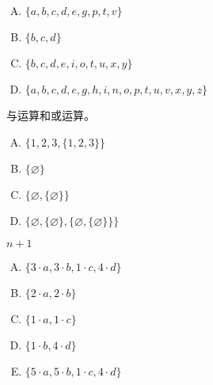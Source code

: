 {{        %
        \begin{practices}
            \begin{enumerate}[A.]
                \item $\{a, b, c, d, e, g, p, t, v\}$
                \item $\{b, c, d\}$
                \item $\{b, c, d, e, i, o, t, u, x, y\}$
                \item $\{a, b, c, d, e, g, h, i, n, o, p, t, u, v, x, y, z\}$
            \end{enumerate}
        \end{practices}

        \begin{practices}
            与运算和或运算。
        \end{practices}

        \begin{practices}
            \begin{enumerate}[A.]
                \item $\{1, 2, 3, \{1, 2, 3\}\}$
                \item $\{\varnothing\}$
                \item $\{\varnothing, \{\varnothing\}\}$
                \item $\{\varnothing, \{\varnothing\}, \{\varnothing, \{\varnothing\}\}\}$
            \end{enumerate}
        \end{practices}

        \begin{practices}
            $n + 1$
        \end{practices}

        \begin{practices}
            \begin{enumerate}[A.]
                \item $\{3 \cdot a, 3 \cdot b, 1 \cdot c, 4 \cdot d\}$
                \item $\{2 \cdot a, 2 \cdot b\}$
                \item $\{1 \cdot a, 1 \cdot c\}$
                \item $\{1 \cdot b, 4 \cdot d\}$
                \item $\{5 \cdot a, 5 \cdot b, 1 \cdot c, 4 \cdot d\}$
            \end{enumerate}
        \end{practices}

}}

